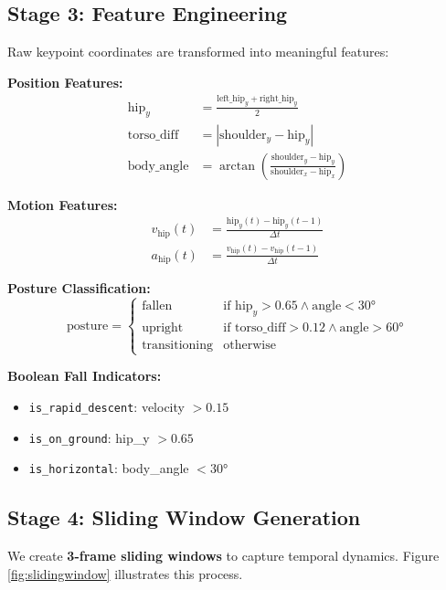 \documentclass[conference]{IEEEtran}
\begin{document}
\subsection{Stage 3: Feature Engineering}

Raw keypoint coordinates are transformed into meaningful features:

\textbf{Position Features:}
\begin{align}
\text{hip}_y &= \frac{\text{left\_hip}_y + \text{right\_hip}_y}{2} \\
\text{torso\_diff} &= |\text{shoulder}_y - \text{hip}_y| \\
\text{body\_angle} &= \arctan\left(\frac{\text{shoulder}_y - \text{hip}_y}{\text{shoulder}_x - \text{hip}_x}\right)
\end{align}

\textbf{Motion Features:}
\begin{align}
v_{\text{hip}}(t) &= \frac{\text{hip}_y(t) - \text{hip}_y(t-1)}{\Delta t} \\
a_{\text{hip}}(t) &= \frac{v_{\text{hip}}(t) - v_{\text{hip}}(t-1)}{\Delta t}
\end{align}

\textbf{Posture Classification:}
\begin{equation}
\text{posture} = \begin{cases}
\text{fallen} & \text{if } \text{hip}_y > 0.65 \land \text{angle} < 30° \\
\text{upright} & \text{if } \text{torso\_diff} > 0.12 \land \text{angle} > 60° \\
\text{transitioning} & \text{otherwise}
\end{cases}
\end{equation}

\textbf{Boolean Fall Indicators:}
\begin{itemize}[leftmargin=*]
    \item \texttt{is\_rapid\_descent}: velocity $> 0.15$
    \item \texttt{is\_on\_ground}: hip\_y $> 0.65$
    \item \texttt{is\_horizontal}: body\_angle $< 30°$
\end{itemize}

\subsection{Stage 4: Sliding Window Generation}

We create \textbf{3-frame sliding windows} to capture temporal dynamics. Figure \ref{fig:slidingwindow} illustrates this process.
\end{document}
